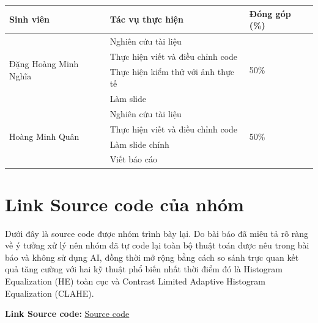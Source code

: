 \documentclass[a4paper]{report}
\begin{document}
\vspace{12.8pt}
\begin{tabular}{|p{49.4mm}|p{80.1mm}|p{25.1mm}|}
\hline
\textbf{Sinh viên} & \textbf{Tác vụ thực hiện} & \textbf{Đóng góp (\%)} \\
\hline
\multirow{4}{*}{Đặng Hoàng Minh Nghĩa}
    & Nghiên cứu tài liệu                    & \multirow{4}{*}{50\%} \\
    & Thực hiện viết và điều chỉnh code      & \\
    & Thực hiện kiểm thử với ảnh thực tế     & \\
    & Làm slide                              & \\
\hline
\multirow{4}{*}{Hoàng Minh Quân}
    & Nghiên cứu tài liệu                    & \multirow{4}{*}{50\%} \\
    & Thực hiện viết và điều chỉnh code      & \\
    & Làm slide chính                        & \\
    & Viết báo cáo                           & \\
\hline
\end{tabular}

\chapter*{Link Source code của nhóm}

Dưới đây là source code được nhóm trình bày lại. Do bài báo đã miêu tả rõ ràng
về ý tưởng xử lý nên nhóm đã tự code lại toàn bộ thuật toán được nêu trong bài
báo và không sử dụng AI, đồng thời mở rộng bằng cách so sánh trực quan kết quả
tăng cường với hai kỹ thuật phổ biến nhất thời điểm đó là Histogram Equalization
(HE) toàn cục và Contrast Limited Adaptive Histogram Equalization (CLAHE).

\textbf{Link Source code:} \href{https://colab.research.google.com/drive/17qr9Ct74zRE9zIkvhLAtKgD-q7CW0OxO?usp=sharing}{Source code}
\end{document}
